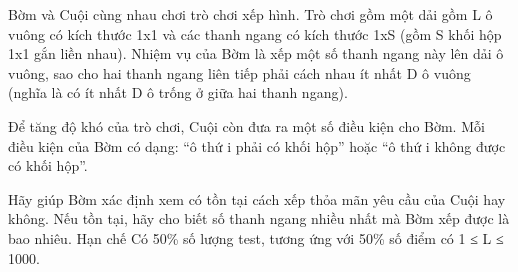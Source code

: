 Bờm và Cuội cùng nhau chơi trò chơi xếp hình. Trò chơi gồm một dải gồm L ô vuông có kích thước 1x1 và các thanh ngang có kích thước 1xS (gồm S khối hộp 1x1 gắn liền nhau). Nhiệm vụ của Bờm là xếp một số thanh ngang này lên dải ô vuông, sao cho hai thanh ngang liên tiếp phải cách nhau ít nhất D ô vuông (nghĩa là có ít nhất D ô trống ở giữa hai thanh ngang).

Để tăng độ khó của trò chơi, Cuội còn đưa ra một số điều kiện cho Bờm. Mỗi điều kiện của Bờm có dạng: “ô thứ i phải có khối hộp” hoặc “ô thứ i không được có khối hộp”.

Hãy giúp Bờm xác định xem có tồn tại cách xếp thỏa mãn yêu cầu của Cuội hay không. Nếu tồn tại, hãy cho biết số thanh ngang nhiều nhất mà Bờm xếp được là bao nhiêu.
Hạn chế
Có 50\% số lượng test, tương ứng với 50\% số điểm có 1 ≤ L ≤ 1000.